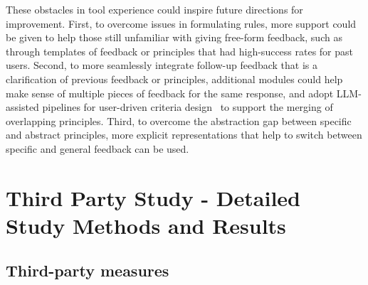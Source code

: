 \documentclass[11pt]{article}
\begin{document}
These obstacles in tool experience could inspire future directions for improvement. First, to overcome issues in formulating rules, more support could be given to help those still unfamiliar with giving free-form feedback, such as through templates of feedback or principles that had high-success rates for past users. Second, to more seamlessly integrate follow-up feedback that is a clarification of previous feedback or principles, additional modules could help make sense of multiple pieces of feedback for the same response, and adopt LLM-assisted pipelines for user-driven criteria design~\cite{kim2024evallm} to support the merging of overlapping principles. Third, to overcome the abstraction gap between specific and abstract principles, more explicit representations that help to switch between specific and general feedback can be used.  





\section{Third Party Study - Detailed Study Methods and Results}

\subsection{Third-party measures} \label{appendix-sec:thirdparty-detailed-measures}
\end{document}
